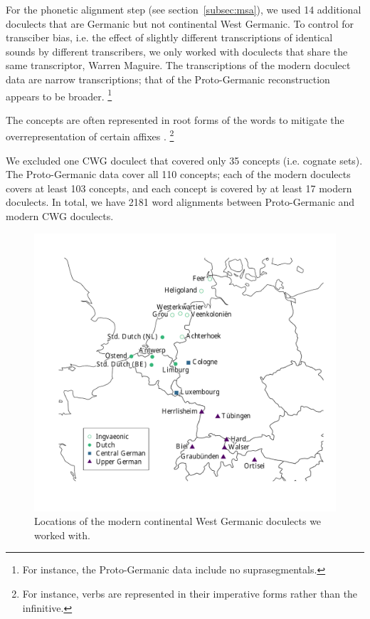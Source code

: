 \documentclass[a4paper]{article}
\begin{document}
For the phonetic alignment step (see section~\ref{subsec:msa}),
we used 14 additional doculects that are Germanic but not continental West Germanic. 
To control for transciber bias,
i.e. the effect of slightly different transcriptions
of identical sounds by different transcribers,
we only worked with doculects that share the same transcriptor,
Warren Maguire.
The transcriptions of the modern doculect data
are narrow transcriptions;
that of the Proto-Germanic reconstruction appears to be broader.%
\footnote{%
For instance, the Proto-Germanic data include no suprasegmentals.
}

The concepts are often represented in root forms
of the words to mitigate the overrepresentation
of certain affixes \citep{renfrew2009languages}.%
\footnote{%
For instance, verbs are represented in their imperative forms
rather than the infinitive.
}

We excluded one CWG doculect that covered only 35 concepts (i.e. cognate sets). %
The Proto-Germanic data cover all 110 concepts; each of the modern doculects covers at least 103 concepts, and each concept is covered by at least 17 modern doculects.
In total, we have 2181 word alignments between Proto-Germanic and modern CWG doculects.


\begin{figure}[h]
\centering
\includegraphics[width=\textwidth]{figures/map.pdf}
\caption{Locations of the modern continental West Germanic doculects we worked with.}
\label{fig:map}
\end{figure}
\end{document}
